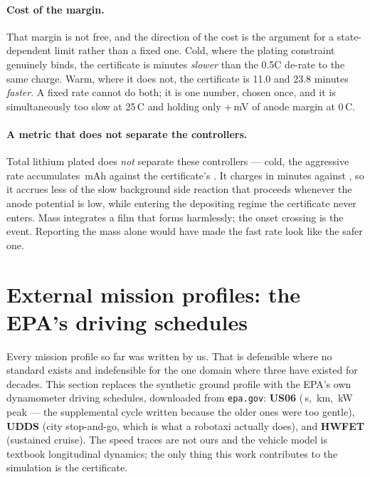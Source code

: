 \documentclass[11pt,letterpaper]{article}
\theoremstyle{definition}
\theoremstyle{remark}
\newcommand{\SI}[2]{#1\,#2}
\newcommand{\degreeCelsius}{\degC}
\newcommand{\degC}{\ifmmode{^\circ}\mathrm{C}\else\textdegree C\fi}
\begin{document}
\paragraph{Cost of the margin.} That margin is not free, and the direction of the cost is the
argument for a state-dependent limit rather than a fixed one. Cold, where the plating constraint
genuinely binds, the certificate is \plMinutes{} minutes \emph{slower} than the 0.5C de-rate to
the same charge. Warm, where it does not, the certificate is 11.0 and 23.8 minutes
\emph{faster}. A fixed rate cannot do both; it is one number, chosen once, and it is
simultaneously too slow at \SI{25}{\degreeCelsius} and holding only $+$\plColdSlowPhi\,mV of anode margin at
\SI{0}{\degreeCelsius}.

\paragraph{A metric that does not separate the controllers.} Total lithium plated does
\emph{not} separate these controllers --- cold, the aggressive rate accumulates
\plAggMah\,mAh against the certificate's \plCertMah. It charges in \plColdFastMin{} minutes
against \plColdCertMin, so it accrues less of the slow background side reaction that proceeds
whenever the anode potential is low, while entering the depositing regime the certificate never
enters. Mass integrates a film that forms harmlessly; the onset crossing is the event. Reporting
the mass alone would have made the fast rate look like the safer one.


\section{External mission profiles: the EPA's driving schedules}\label{sec:cycles}

Every mission profile so far was written by us. That is defensible where no standard exists and
indefensible for the one domain where three have existed for decades. This section replaces the
synthetic ground profile with the EPA's own dynamometer driving schedules, downloaded from
\texttt{epa.gov}: \textbf{US06} (\dUSsixSec\,s, \dUSsixKm\,km, \dUSsixPeakkW\,kW peak --- the
supplemental cycle written because the older ones were too gentle), \textbf{UDDS} (city
stop-and-go, which is what a robotaxi actually does), and \textbf{HWFET} (sustained cruise). The
speed traces are not ours and the vehicle model is textbook longitudinal dynamics; the only
thing this work contributes to the simulation is the certificate.
\end{document}
